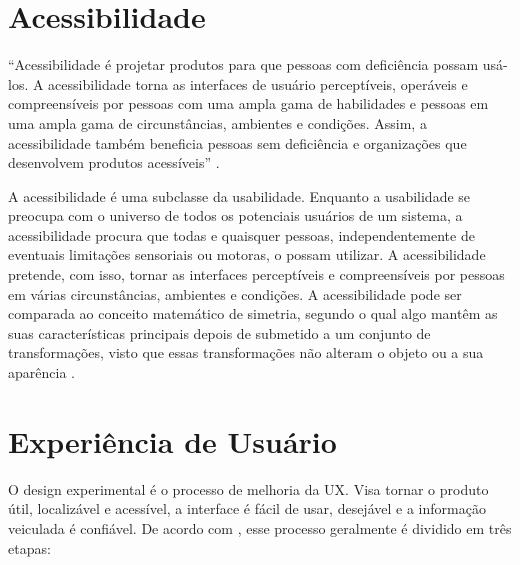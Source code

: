 \section{Acessibilidade}
\label{Acessibilidade}

 \begin{citacao}
 “Acessibilidade é projetar produtos para que pessoas com deficiência possam usá-los. A acessibilidade torna as interfaces de usuário perceptíveis, operáveis e compreensíveis por pessoas com uma ampla gama de habilidades e pessoas em uma ampla gama de circunstâncias, ambientes e condições. Assim, a acessibilidade também beneficia pessoas sem deficiência e organizações que desenvolvem produtos acessíveis” \cite{slhjustask}.
\end{citacao}

A acessibilidade é uma subclasse da usabilidade. Enquanto a usabilidade se preocupa com o universo de todos os potenciais usuários de um sistema, a acessibilidade procura que todas e quaisquer pessoas, independentemente de eventuais limitações sensoriais ou motoras, o possam utilizar. A acessibilidade pretende, com isso, tornar as interfaces perceptíveis e compreensíveis por pessoas em várias circunstâncias, ambientes e condições. A acessibilidade pode ser comparada ao conceito matemático de simetria, segundo o qual algo mantêm as suas características principais depois de submetido a um conjunto de transformações, visto que essas transformações não alteram o objeto ou a sua aparência \cite{matos2021estudo} .
 
\section{Experiência de Usuário}
\label{Experiência_de_Usuário}

O design experimental é o processo de melhoria da \acf{UX}. Visa tornar o produto útil, localizável e acessível, a interface é fácil de usar, desejável e a informação veiculada é confiável. De acordo com , esse processo geralmente é dividido em três etapas:

